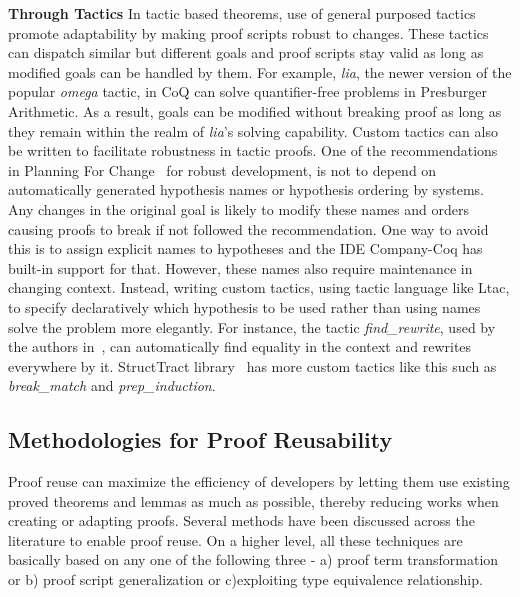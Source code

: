 \textbf{Through Tactics}
In tactic based theorems, use of general purposed tactics promote adaptability by making proof scripts robust to changes. These tactics can dispatch similar but different goals and proof scripts stay valid as long as modified goals can be handled by them. For example, \emph{lia}, the newer version of the popular \emph{omega} tactic, in CoQ can solve quantifier-free problems in Presburger Arithmetic. As a result, goals can be modified without breaking proof as long as they remain within the realm of \emph{lia}'s solving capability. Custom tactics can also be written to facilitate robustness in tactic proofs. One of the recommendations in Planning For Change~\cite{Woos_et_al_2016} for robust development, is not to depend on automatically generated hypothesis names or hypothesis ordering by systems. Any changes in the original goal is likely to modify these names and orders causing proofs to break if not followed the recommendation. One way to avoid this is to assign explicit names to hypotheses and the IDE Company-Coq has built-in support for that. However, these names also require maintenance in changing context. Instead, writing custom tactics, using tactic language like Ltac, to specify declaratively which hypothesis to be used rather than using names solve the problem more elegantly. For instance, the tactic \emph{find\_rewrite}, used by the authors in~\cite{Woos_et_al_2016}, can automatically find equality in the context and rewrites everywhere by it. StructTract library~\cite{StructTact_2016} has more custom tactics like this such as \emph{break\_match} and \emph{prep\_induction}. 

\subsection{Methodologies for Proof Reusability}

Proof reuse can maximize the efficiency of developers by letting them use existing proved theorems and lemmas as much as possible, thereby reducing works when creating or adapting proofs. Several methods have been discussed across the literature to enable proof reuse. On a higher level, all these techniques are basically based on any one of the following three - a) proof term transformation or b) proof script generalization or c)exploiting type equivalence relationship. \\ %


